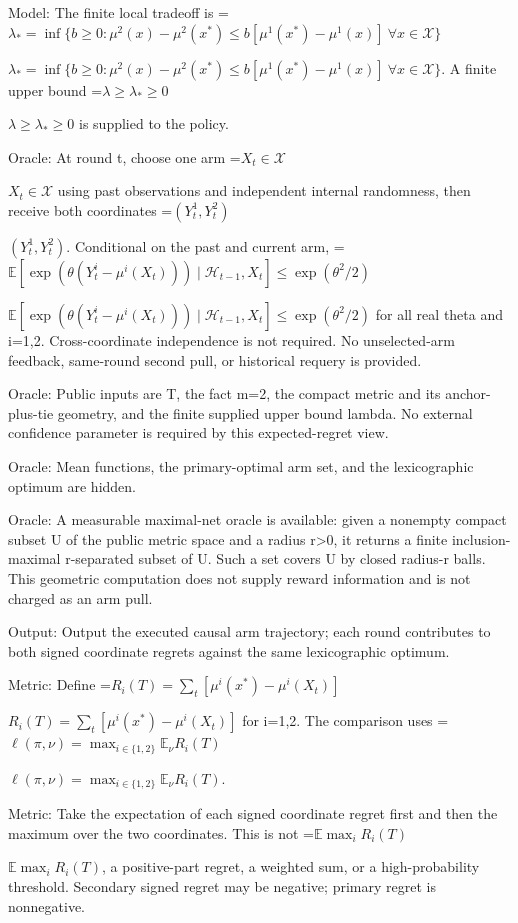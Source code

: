 \documentclass[10pt,a4paper]{article}
\newcommand{\AtlasMath}[1]{\par\begingroup\centering\setbox0=\hbox{$\displaystyle #1$}\ifdim\wd0>1.4\linewidth\typeout{ATLAS WIDE FORMULA: \the\wd0}\fi\ifdim\wd0>\linewidth\resizebox{\linewidth}{!}{\box0}\else\box0\fi\par\endgroup}
\newcommand{\AtlasInlineMath}[1]{\begingroup\setbox0=\hbox{$#1$}\ifdim\wd0>.4\linewidth\endgroup\AtlasMath{#1}\else\endgroup$#1$\fi}
\begin{document}
Model: The finite local tradeoff is \AtlasInlineMath{\lambda_*=\inf\{b\ge0:\mu^2(x)-\mu^2(x^*)\le b[\mu^1(x^*)-\mu^1(x)]\ \forall x\in\mathcal X\}}. A finite upper bound \AtlasInlineMath{\lambda\ge\lambda_*\ge0} is supplied to the policy.



Oracle: At round t, choose one arm \AtlasInlineMath{X_t\in\mathcal X} using past observations and independent internal randomness, then receive both coordinates \AtlasInlineMath{(Y_t^1,Y_t^2)}. Conditional on the past and current arm, \AtlasInlineMath{\mathbb E[\exp(\theta(Y_t^i-\mu^i(X_t)))\mid\mathcal H_{t-1},X_t]\le\exp(\theta^2/2)} for all real theta and i=1,2. Cross-coordinate independence is not required. No unselected-arm feedback, same-round second pull, or historical requery is provided.



Oracle: Public inputs are T, the fact m=2, the compact metric and its anchor-plus-tie geometry, and the finite supplied upper bound lambda. No external confidence parameter is required by this expected-regret view.



Oracle: Mean functions, the primary-optimal arm set, and the lexicographic optimum are hidden.



Oracle: A measurable maximal-net oracle is available: given a nonempty compact subset U of the public metric space and a radius r>0, it returns a finite inclusion-maximal r-separated subset of U. Such a set covers U by closed radius-r balls. This geometric computation does not supply reward information and is not charged as an arm pull.



Output: Output the executed causal arm trajectory; each round contributes to both signed coordinate regrets against the same lexicographic optimum.



Metric: Define \AtlasInlineMath{R_i(T)=\sum_t[\mu^i(x^*)-\mu^i(X_t)]} for i=1,2. The comparison uses \AtlasInlineMath{\ell(\pi,\nu)=\max_{i\in\{1,2\}}\mathbb E_\nu R_i(T)}.



Metric: Take the expectation of each signed coordinate regret first and then the maximum over the two coordinates. This is not \AtlasInlineMath{\mathbb E\max_iR_i(T)}, a positive-part regret, a weighted sum, or a high-probability threshold. Secondary signed regret may be negative; primary regret is nonnegative.
\end{document}
